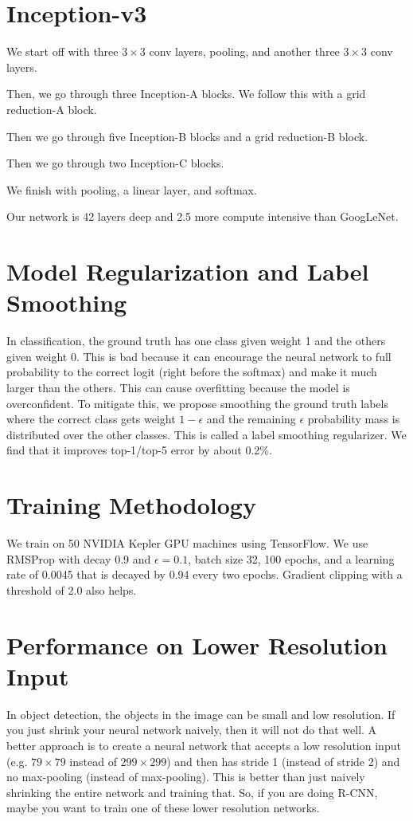 \documentclass[a4paper]{article}
\begin{document}
\section{Inception-v3}
We start off with three $3 \times 3$ conv layers, pooling, and another three
$3 \times 3$ conv layers.

Then, we go through three Inception-A blocks. We follow this with a grid
reduction-A block.

Then we go through five Inception-B blocks and a grid reduction-B block.

Then we go through two Inception-C blocks.

We finish with pooling, a linear layer, and softmax.

Our network is 42 layers deep and 2.5 more compute intensive than GoogLeNet.

\section{Model Regularization and Label Smoothing}
In classification, the ground truth has one class given weight 1 and the others
given weight 0. This is bad because it can encourage the neural network to
full probability to the correct logit (right before the softmax) and make it
much larger than the others. This can cause overfitting because the model is
overconfident. To mitigate this, we propose smoothing the ground truth labels
where the correct class gets weight $1 - \epsilon$ and the remaining $\epsilon$
probability mass is distributed over the other classes. This is called a
label smoothing regularizer. We find that it improves top-1/top-5 error by about
0.2\%.

\section{Training Methodology}
We train on 50 NVIDIA Kepler GPU machines using TensorFlow. We use RMSProp with
decay 0.9 and $\epsilon = 0.1$, batch size 32, 100 epochs, and a learning rate
of 0.0045 that is decayed by 0.94 every two epochs. Gradient clipping with
a threshold of 2.0 also helps.

\section{Performance on Lower Resolution Input}
In object detection, the objects in the image can be small and low resolution.
If you just shrink your neural network naively, then it will not do that well.
A better approach is to create a neural network that accepts a low resolution
input (e.g. $79 \times 79$ instead of $299 \times 299$) and then has stride 1
(instead of stride 2) and no max-pooling (instead of max-pooling). This is
better than just naively shrinking the entire network and training that. So,
if you are doing R-CNN, maybe you want to train one of these lower resolution
networks.
\end{document}
